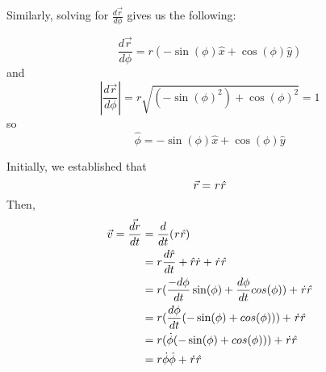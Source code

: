 \documentclass{article}
\begin{document}
Similarly, solving for $\frac{d\vec{r}}{d\phi}$ gives us the following:

\[\frac{d\vec{r}}{d\phi} = r(-\sin(\phi)\hat{x} + \cos(\phi)\hat{y})\]
and
\[|\frac{d\vec{r}}{d\phi}| = r\sqrt{(-\sin(\phi)^2) + \cos(\phi)^2} = 1\]
so
\[\hat{\phi} = -\sin(\phi)\hat{x} + \cos(\phi)\hat{y}\]

Initially, we established that
\[\vec{r} = \it{r}\hat{r}\]
Then,
\begin{equation}
    \begin{aligned}
        \vec{v} = \frac{\vec{dr}}{dt} & = \frac{d}{dt}(\it{r}\hat{r})                                                      \\
                                      & = r\frac{d\hat{r}}{dt} + \hat{r}\dot{r} + \it{\dot{r}}\hat{r}                      \\
                                      & = r(\frac{-d\phi}{dt}\sin(\phi) + \frac{d\phi}{dt}cos(\phi)) + \it{\dot{r}}\hat{r} \\
                                      & = r(\frac{d\phi}{dt}(-\sin(\phi) + cos(\phi))) + \it{\dot{r}}\hat{r}               \\
                                      & = r(\dot{\phi}(-\sin(\phi) + cos(\phi))) + \it{\dot{r}}\hat{r}                     \\
                                      & = r\dot{\phi}\hat{\phi} + \it{\dot{r}}\hat{r}                                      \\
    \end{aligned}
\end{equation}
\end{document}
